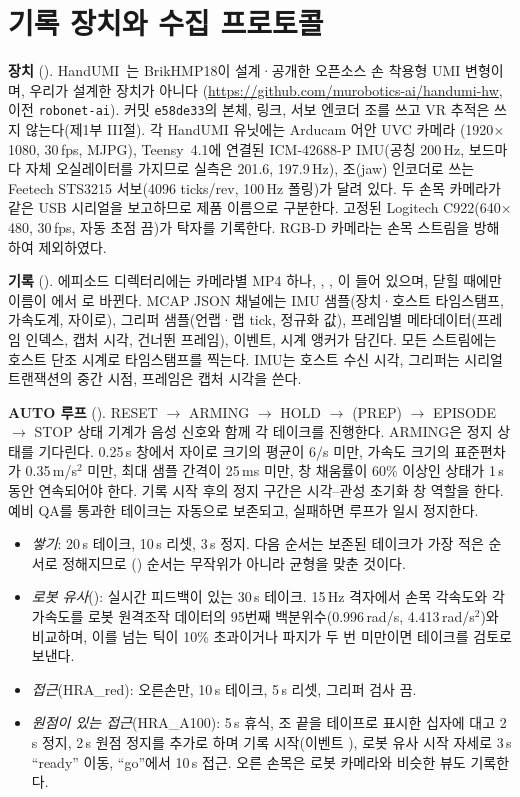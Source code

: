 \documentclass[conference,10pt]{IEEEtran}
\begin{document}
\section{기록 장치와 수집 프로토콜}\label{sec:rig}
\textbf{장치} (). HandUMI~\cite{handumi_hw}는 BrikHMP18이 설계·공개한 오픈소스 손 착용형 UMI 변형이며, 우리가 설계한 장치가 아니다
(\url{https://github.com/murobotics-ai/handumi-hw}, 이전 \texttt{robonet-ai}). 커밋 \texttt{e58de33}의 본체, 링크, 서보 엔코더 조를 쓰고
VR 추적은 쓰지 않는다(제1부 III절). 각 HandUMI 유닛에는 Arducam 어안 UVC 카메라
(1920$\times$1080, 30\,fps, MJPG), Teensy~4.1에 연결된 ICM-42688-P IMU(공칭 200\,Hz, 보드마다 자체 오실레이터를 가지므로 실측은
201.6, 197.9\,Hz), 조(jaw) 인코더로 쓰는 Feetech STS3215 서보(4096 ticks/rev, 100\,Hz 폴링)가 달려 있다. 두 손목 카메라가 같은
USB 시리얼을 보고하므로 제품 이름으로 구분한다. 고정된 Logitech C922(640$\times$480, 30\,fps, 자동 초점 끔)가 탁자를 기록한다.
RGB-D 카메라는 손목 스트림을 방해하여 제외하였다.

\textbf{기록} (). 에피소드 디렉터리에는 카메라별 MP4 하나, , ,
이 들어 있으며, 닫힐 때에만 이름이 에서 로 바뀐다. MCAP JSON 채널에는
IMU 샘플(장치·호스트 타임스탬프, 가속도계, 자이로), 그리퍼 샘플(언랩·랩 tick, 정규화 값), 프레임별 메타데이터(프레임 인덱스,
캡처 시각, 건너뛴 프레임), 이벤트, 시계 앵커가 담긴다. 모든 스트림에는 호스트 단조 시계로 타임스탬프를 찍는다. IMU는 호스트 수신
시각, 그리퍼는 시리얼 트랜잭션의 중간 시점, 프레임은 캡처 시각을 쓴다.

\textbf{AUTO 루프} (). RESET $\to$ ARMING $\to$ HOLD $\to$ (PREP) $\to$ EPISODE $\to$ STOP 상태
기계가 음성 신호와 함께 각 테이크를 진행한다. ARMING은 정지 상태를 기다린다. 0.25\,s 창에서 자이로 크기의 평균이 6\textdegree/s
미만, 가속도 크기의 표준편차가 0.35\,m/s$^2$ 미만, 최대 샘플 간격이 25\,ms 미만, 창 채움률이 60\% 이상인 상태가 1\,s 동안 연속되어야
한다. 기록 시작 후의 정지 구간은 시각--관성 초기화 창 역할을 한다. 예비 QA를 통과한 테이크는 자동으로 보존되고, 실패하면 루프가
일시 정지한다.
\begin{itemize}
\item \emph{쌓기}: 20\,s 테이크, 10\,s 리셋, 3\,s 정지. 다음 순서는 보존된 테이크가 가장 적은 순서로 정해지므로
() 순서는 무작위가 아니라 균형을 맞춘 것이다.
\item \emph{로봇 유사}(): 실시간 피드백이 있는 30\,s 테이크. 15\,Hz 격자에서 손목 각속도와 각가속도를 로봇
원격조작 데이터의 95번째 백분위수(0.996\,rad/s, 4.413\,rad/s$^2$)와 비교하며, 이를 넘는 틱이 10\% 초과이거나 파지가 두 번 미만이면
테이크를 검토로 보낸다.
\item \emph{접근}(HRA\_red): 오른손만, 10\,s 테이크, 5\,s 리셋, 그리퍼 검사 끔.
\item \emph{원점이 있는 접근}(HRA\_A100): 5\,s 휴식, 조 끝을 테이프로 표시한 십자에 대고 2\,s 정지, 2\,s 원점 정지를 추가로 하며
기록 시작(이벤트 ), 로봇 유사 시작 자세로 3\,s ``ready'' 이동, ``go''에서 10\,s 접근. 오른 손목은 로봇 카메라와 비슷한
뷰도 기록한다.
\end{itemize}
\end{document}
